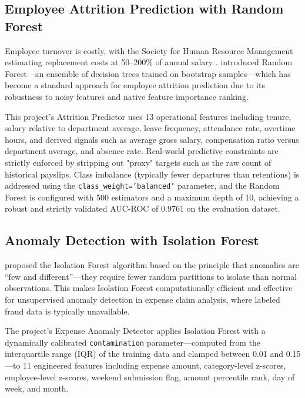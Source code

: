 \documentclass[12pt,a4paper]{report}
\begin{document}
\subsection{Employee Attrition Prediction with Random Forest}

Employee turnover is costly, with the Society for Human Resource Management estimating replacement costs at 50--200\% of annual salary \citep{shrm2022}. \citet{breiman2001random} introduced Random Forest---an ensemble of decision trees trained on bootstrap samples---which has become a standard approach for employee attrition prediction due to its robustness to noisy features and native feature importance ranking.

This project's Attrition Predictor uses 13 operational features including tenure, salary relative to department average, leave frequency, attendance rate, overtime hours, and derived signals such as average gross salary, compensation ratio versus department average, and absence rate. Real-world predictive constraints are strictly enforced by stripping out "proxy" targets such as the raw count of historical payslips. Class imbalance (typically fewer departures than retentions) is addressed using the \texttt{class\_weight='balanced'} parameter, and the Random Forest is configured with 500 estimators and a maximum depth of 10, achieving a robust and strictly validated AUC-ROC of 0.9761 on the evaluation dataset.

\subsection{Anomaly Detection with Isolation Forest}

\citet{liu2008isolation} proposed the Isolation Forest algorithm based on the principle that anomalies are ``few and different''---they require fewer random partitions to isolate than normal observations. This makes Isolation Forest computationally efficient and effective for unsupervised anomaly detection in expense claim analysis, where labeled fraud data is typically unavailable.

The project's Expense Anomaly Detector applies Isolation Forest with a dynamically calibrated \texttt{contamination} parameter---computed from the interquartile range (IQR) of the training data and clamped between 0.01 and 0.15---to 11 engineered features including expense amount, category-level z-scores, employee-level z-scores, weekend submission flag, amount percentile rank, day of week, and month.
\end{document}

